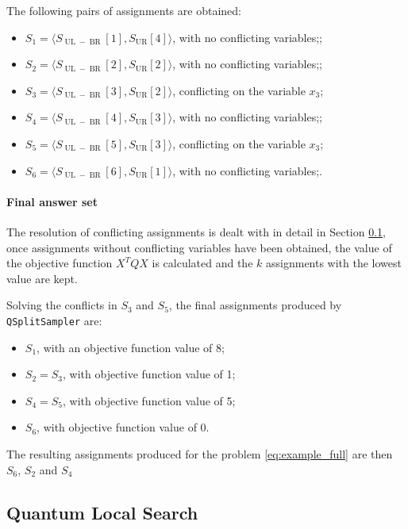 The following pairs of assignments are obtained:
\begin{itemize}
    \item $S_1 = \langle S_{\operatorname{UL}-\operatorname{BR}}[1], S_{\operatorname{UR}}[4]\rangle$, with no conflicting variables;;
    \item $S_2 = \langle S_{\operatorname{UL}-\operatorname{BR}}[2], S_{\operatorname{UR}}[2]\rangle$, with no conflicting variables;;
    \item $S_3 = \langle S_{\operatorname{UL}-\operatorname{BR}}[3], S_{\operatorname{UR}}[2]\rangle$, conflicting on the variable $x_3$;
    \item $S_4 = \langle S_{\operatorname{UL}-\operatorname{BR}}[4], S_{\operatorname{UR}}[3]\rangle$, with no conflicting variables;;
    \item $S_5 = \langle S_{\operatorname{UL}-\operatorname{BR}}[5], S_{\operatorname{UR}}[3]\rangle$, conflicting on the variable $x_3$;
    \item $S_6 = \langle S_{\operatorname{UL}-\operatorname{BR}}[6], S_{\operatorname{UR}}[1]\rangle$, with no conflicting variables;.
\end{itemize}

\paragraph{Final answer set} The resolution of conflicting assignments is dealt with in detail in Section \ref{sec:qsearch}, once assignments without conflicting variables have been obtained, the value of the objective function $X^TQX$ is calculated and the $k$ assignments with the lowest value are kept.

Solving the conflicts in $S_3$ and $S_5$, the final assignments produced by \texttt{QSplitSampler} are:
\begin{itemize}
    \item $S_1$, with an objective function value of 8;
    \item $S_2 = S_3$, with objective function value of 1;
    \item $S_4 = S_5$, with objective function value of 5;
    \item $S_6$, with objective function value of 0.
\end{itemize}

The resulting assignments produced for the problem \eqref{eq:example_full} are then $S_6$, $S_2$ and $S_4$

\subsection{Quantum Local Search}\label{sec:qsearch}

